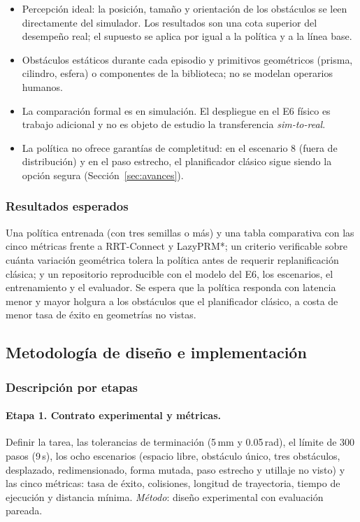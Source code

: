 \documentclass[11pt,a4paper,twoside]{article}
\begin{document}
\begin{itemize}
\item Percepción ideal: la posición, tamaño y orientación de los obstáculos se leen directamente del simulador. Los resultados son una cota superior del desempeño real; el supuesto se aplica por igual a la política y a la línea base.
\item Obstáculos estáticos durante cada episodio y primitivos geométricos (prisma, cilindro, esfera) o componentes de la biblioteca; no se modelan operarios humanos.
\item La comparación formal es en simulación. El despliegue en el E6 físico es trabajo adicional y no es objeto de estudio la transferencia \emph{sim-to-real}.
\item La política no ofrece garantías de completitud: en el escenario 8 (fuera de distribución) y en el paso estrecho, el planificador clásico sigue siendo la opción segura (Sección~\ref{sec:avances}).
\end{itemize}

\subsubsection{Resultados esperados}

Una política entrenada (con tres semillas o más) y una tabla comparativa con las cinco métricas frente a RRT-Connect y LazyPRM*; un criterio verificable sobre cuánta variación geométrica tolera la política antes de requerir replanificación clásica; y un repositorio reproducible con el modelo del E6, los escenarios, el entrenamiento y el evaluador. Se espera que la política responda con latencia menor y mayor holgura a los obstáculos que el planificador clásico, a costa de menor tasa de éxito en geometrías no vistas.

\subsection{Metodología de diseño e implementación}

\subsubsection{Descripción por etapas}

\paragraph{Etapa 1. Contrato experimental y métricas.} Definir la tarea, las tolerancias de terminación (5\,mm y 0.05\,rad), el límite de 300 pasos (9\,s), los ocho escenarios (espacio libre, obstáculo único, tres obstáculos, desplazado, redimensionado, forma mutada, paso estrecho y utillaje no visto) y las cinco métricas: tasa de éxito, colisiones, longitud de trayectoria, tiempo de ejecución y distancia mínima. \emph{Método}: diseño experimental con evaluación pareada.
\end{document}
